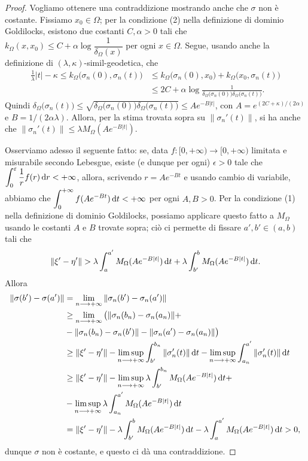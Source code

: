 \begin{proof}
    Vogliamo ottenere una contraddizione mostrando anche che $\sigma$ non è costante. Fissiamo $x_0\in\Omega$; per la condizione (2) nella definizione di dominio Goldilocks, esistono due costanti $C,\alpha>0$ tali che $k_\Omega(x,x_0) \le C+\alpha\log{\dfrac{1}{\delta_\Omega(x)}}$ per ogni $x\in\Omega$. Segue, usando anche la definizione di $(\lambda,\kappa)$-simil-geodetica, che
    \begin{align*}
        \frac{1}{\lambda}|t|-\kappa \le k_\Omega\big(\sigma_n(0),\sigma_n(t)\big) &\le k_\Omega\big(\sigma_n(0),x_0\big)+k_\Omega\big(x_0,\sigma_n(t)\big)\\
        &\le 2C+\alpha\log{\frac{1}{\delta_\Omega\big(\sigma_n(0)\big)\delta_\Omega\big(\sigma_n(t)\big)}}.
    \end{align*}
    Quindi $\delta_\Omega\big(\sigma_n(t)\big) \le \sqrt{\delta_\Omega\big(\sigma_n(0)\big)\delta_\Omega\big(\sigma_n(t)\big)} \le Ae^{-B|t|}$, con $A=e^{(2C+\kappa)/(2\alpha)}$ e $B=1/(2\alpha\lambda)$. Allora, per la stima trovata sopra su $\|\sigma_n'(t)\|$, si ha anche che $\|\sigma_n'(t)\| \le \lambda M_\Omega(Ae^{-B|t|})$.
    
    Osserviamo adesso il seguente fatto: se, data $f:[0,+\infty)\longrightarrow[0,+\infty)$ limitata e misurabile secondo Lebesgue, esiste (e dunque per ogni) $\epsilon>0$ tale che $\displaystyle \int_0^\varepsilon \frac{1}{r}f(r)\mathop{}\!\mathrm{d} r<+\infty$, allora, scrivendo $r=Ae^{-Bt}$ e usando cambio di variabile, abbiamo che $\displaystyle\int_0^{+\infty} f(Ae^{-Bt})\mathop{}\!\mathrm{d} t<+\infty$ per ogni $A,B>0$. Per la condizione (1) nella definizione di dominio Goldilocks, possiamo applicare questo fatto a $M_\Omega$ usando le costanti $A$ e $B$ trovate sopra; ciò ci permette di fissare $a',b'\in(a,b)$ tali che
    $$\|\xi'-\eta'\|>\lambda\int_a^{a'} M_\Omega(Ae^{-B|t|})\diff t+\lambda\int_{b'}^b M_\Omega(Ae^{-B|t|})\diff t.$$
    Allora
    \begin{align*}
        \|\sigma(b')-\sigma(a')\|&=\lim_{n\longrightarrow+\infty}\|\sigma_n(b')-\sigma_n(a')\| \\
        & \ge \lim_{n\longrightarrow+\infty}\big(\|\sigma_n(b_n)-\sigma_n(a_n)\|+\\
        &-\|\sigma_n(b_n)-\sigma_n(b')\|-\|\sigma_n(a')-\sigma_n(a_n)\|\big) \\
        &\ge \|\xi'-\eta'\|-\limsup_{n\longrightarrow+\infty}\int_{b'}^{b_n}\|\sigma_n'(t)\|\mathop{}\!\mathrm{d} t-\limsup_{n\longrightarrow+\infty}\int_{a_n}^{a'}\|\sigma_n'(t)\|\mathop{}\!\mathrm{d} t\\
        &\ge \|\xi'-\eta'\|-\limsup_{n\longrightarrow+\infty}\lambda\int_{b'}^{b_n}M_\Omega(Ae^{-B|t|})\mathop{}\!\mathrm{d} t+\\
        &-\limsup_{n\longrightarrow+\infty}\lambda\int_{a_n}^{a'}M_\Omega(Ae^{-B|t|})\mathop{}\!\mathrm{d} t\\
        &=\|\xi'-\eta'\|-\lambda\int_{b'}^b M_\Omega(Ae^{-B|t|})\mathop{}\!\mathrm{d} t-\lambda\int_a^{a'}M_\Omega(Ae^{-B|t|})\mathop{}\!\mathrm{d} t>0,
    \end{align*}
    dunque $\sigma$ non è costante, e questo ci dà una contraddizione.
\end{proof}